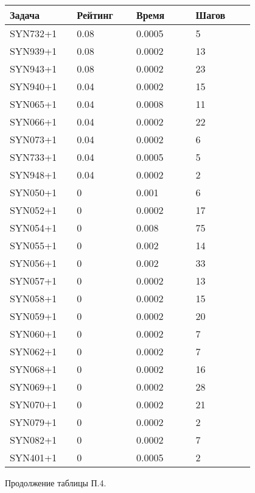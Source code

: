 \begin{longtable}[H]{|p{0.2\linewidth}|p{0.2\linewidth}|p{0.2\linewidth}|p{0.2\linewidth}|}
\hline
\textbf{Задача} & \textbf{Рейтинг} & \textbf{Время} & \textbf{Шагов} \\
\hline
SYN732+1 &  0.08 &  0.0005 &  5 \\
\hline
SYN939+1 &  0.08 &  0.0002 &  13 \\
\hline
SYN943+1 &  0.08 &  0.0002 &  23 \\
\hline
SYN940+1 &  0.04 &  0.0002 &  15 \\
\hline
SYN065+1 &  0.04 &  0.0008 &  11 \\
\hline
SYN066+1 &  0.04 &  0.0002 &  22 \\
\hline
SYN073+1 &  0.04 &  0.0002 &  6 \\
\hline
SYN733+1 &  0.04 &  0.0005 &  5 \\
\hline
SYN948+1 &  0.04 &  0.0002 &  2 \\
\hline
SYN050+1 &  0 &  0.001 &  6 \\
\hline
SYN052+1 &  0 &  0.0002 &  17 \\
\hline
SYN054+1 &  0 &  0.008 &  75 \\
\hline
SYN055+1 &  0 &  0.002 &  14 \\
\hline
SYN056+1 &  0 &  0.002 &  33 \\
\hline
SYN057+1 &  0 &  0.0002 &  13 \\
\hline
SYN058+1 &  0 &  0.0002 &  15 \\
\hline
SYN059+1 &  0 &  0.0002 &  20 \\
\hline
SYN060+1 &  0 &  0.0002 &  7 \\
\hline
SYN062+1 &  0 &  0.0002 &  7 \\
\hline
SYN068+1 &  0 &  0.0002 &  16 \\
\hline
SYN069+1 &  0 &  0.0002 &  28 \\
\hline
SYN070+1 &  0 &  0.0002 &  21 \\
\hline
SYN079+1 &  0 &  0.0002 &  2 \\
\hline
SYN082+1 &  0 &  0.0002 &  7 \\
\hline
SYN401+1 &  0 &  0.0005 &  2 \\
\hline
\end{longtable}
\begin{center}
Продолжение таблицы П.4.
\end{center}

